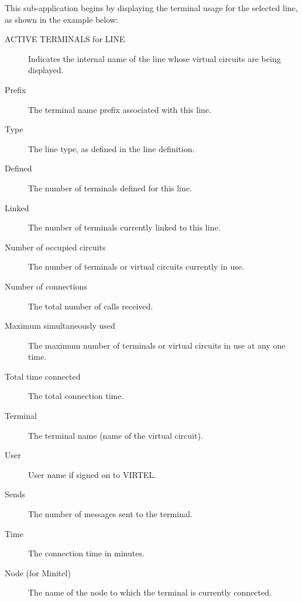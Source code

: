 \documentclass[letterpaper,10pt,english]{sphinxmanual}
\begin{document}
This sub-application begins by displaying the terminal usage for the selected line, as shown in the example below:


\begin{description}
\item[{ACTIVE TERMINALS for LINE}] \leavevmode
Indicates the internal name of the line whose virtual circuits are being displayed.

\item[{Prefix}] \leavevmode
The terminal name prefix associated with this line.

\item[{Type}] \leavevmode
The line type, as defined in the line definition.

\item[{Defined}] \leavevmode
The number of terminals defined for this line.

\item[{Linked}] \leavevmode
The number of terminals currently linked to this line.

\item[{Number of occupied circuits}] \leavevmode
The number of terminals or virtual circuits currently in use.

\item[{Number of connections}] \leavevmode
The total number of calls received.

\item[{Maximum simultaneously used}] \leavevmode
The maximum number of terminals or virtual circuits in use at any one time.

\item[{Total time connected}] \leavevmode
The total connection time.

\item[{Terminal}] \leavevmode
The terminal name (name of the virtual circuit).

\item[{User}] \leavevmode
User name if signed on to VIRTEL.

\item[{Sends}] \leavevmode
The number of messages sent to the terminal.

\item[{Time}] \leavevmode
The connection time in minutes.

\item[{Node (for Minitel)}] \leavevmode
The name of the node to which the terminal is currently connected.


\end{description}
\end{document}
